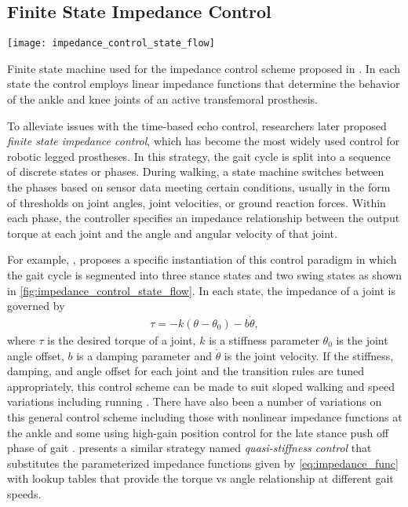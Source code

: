 \subsection{Finite State Impedance Control}\label{sec:back_walk_fsm}
\begin{marginfigure}
    \centering
    \texttt{[image: impedance\_control\_state\_flow]}
    \caption[Example finite state machine for the impedance control]{Finite
    state machine used for the impedance control scheme proposed in
    \citet{sup2009preliminary}. In each state the control employs linear
    impedance functions that determine the behavior of the ankle and knee joints
    of an active transfemoral
    prosthesis.}\label{fig:impedance_control_state_flow}
\end{marginfigure}
To alleviate issues with the time-based echo control, researchers later proposed
\emph{finite state impedance control}, which has become the most widely used
control for robotic legged prostheses. In this strategy, the gait cycle is split
into a sequence of discrete states or phases. During walking, a state machine
switches between the phases based on sensor data meeting certain conditions,
usually in the form of thresholds on joint angles, joint velocities, or ground
reaction forces. Within each phase, the controller specifies an impedance
relationship between the output torque at each joint and the angle and angular
velocity of that joint.

For example, \citet{sup2009preliminary}, proposes a specific instantiation of
this control paradigm in which the gait cycle is segmented into three stance
states and two swing states as shown in \cref{fig:impedance_control_state_flow}.
In each state, the impedance of a joint is governed by
\begin{align}
    \tau = -k (\theta - \theta_{0}) - b \dot \theta,\label{eq:impedance_func}
\end{align}
where $\tau$ is the desired torque of a joint, $k$ is a stiffness parameter
$\theta_{0}$ is the joint angle offset, $b$ is a damping parameter and $\dot
\theta$ is the joint velocity. If the stiffness, damping, and angle offset for
each joint and the transition rules are tuned appropriately, this control scheme
can be made to suit sloped walking \citep{sup2011upslope} and speed variations
\citep{shultz2016variable} including running \citep{shultz2015running}. There
have also been a number of variations on this general control scheme including
those with nonlinear impedance functions at the ankle
\citep{sup2007design,shultz2014walking} and some using high-gain position
control for the late stance push off phase of gait \citep{lawson2014robotic}.
\citet{lenzi2014speed} presents a similar strategy named \emph{quasi-stiffness
control} that substitutes the parameterized impedance functions given by
\cref{eq:impedance_func} with lookup tables that provide the torque vs angle
relationship at different gait speeds. 


